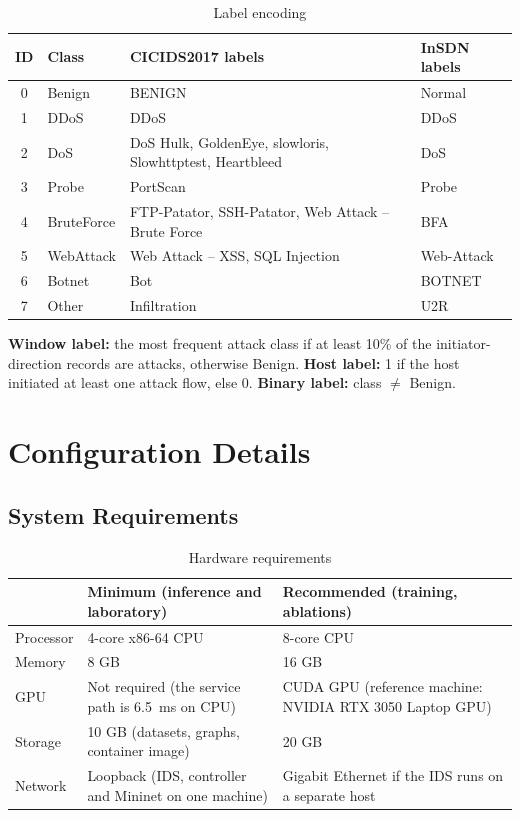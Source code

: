 \begin{appendices}
\begin{table}[htbp]
\centering
\caption{Label encoding}
\label{tab:labels}
\small
\begin{tabularx}{\textwidth}{|c|l|X|X|}
\hline
\textbf{ID} & \textbf{Class} & \textbf{CICIDS2017 labels} & \textbf{InSDN labels} \\ \hline
0 & Benign & BENIGN & Normal \\ \hline
1 & DDoS & DDoS & DDoS \\ \hline
2 & DoS & DoS Hulk, GoldenEye, slowloris, Slowhttptest, Heartbleed & DoS \\ \hline
3 & Probe & PortScan & Probe \\ \hline
4 & BruteForce & FTP-Patator, SSH-Patator, Web Attack -- Brute Force & BFA \\ \hline
5 & WebAttack & Web Attack -- XSS, SQL Injection & Web-Attack \\ \hline
6 & Botnet & Bot & BOTNET \\ \hline
7 & Other & Infiltration & U2R \\ \hline
\end{tabularx}
\end{table}

\textbf{Window label:} the most frequent attack class if at least 10\% of the initiator-direction records are attacks, otherwise Benign. \textbf{Host label:} 1 if the host initiated at least one attack flow, else 0. \textbf{Binary label:} class $\ne$ Benign.

\chapter{Configuration Details}
\section{System Requirements}
\begin{table}[htbp]
\centering
\caption{Hardware requirements}
\label{tab:hw}
\small
\begin{tabularx}{\textwidth}{|l|X|X|}
\hline
 & \textbf{Minimum (inference and laboratory)} & \textbf{Recommended (training, ablations)} \\ \hline
Processor & 4-core x86-64 CPU & 8-core CPU \\ \hline
Memory & 8 GB & 16 GB \\ \hline
GPU & Not required (the service path is 6.5~ms on CPU) & CUDA GPU (reference machine: NVIDIA RTX 3050 Laptop GPU) \\ \hline
Storage & 10 GB (datasets, graphs, container image) & 20 GB \\ \hline
Network & Loopback (IDS, controller and Mininet on one machine) & Gigabit Ethernet if the IDS runs on a separate host \\ \hline
\end{tabularx}
\end{table}


\end{appendices}
